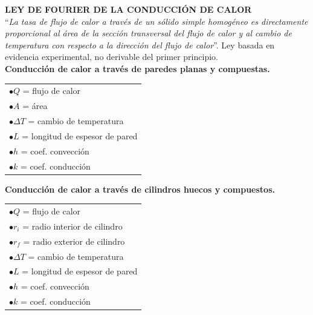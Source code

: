 \documentclass[11pt,a4paper,twocolumn]{article}
\begin{document}
	\textbf{LEY DE FOURIER DE LA CONDUCCIÓN DE CALOR}\\
	``\textit{La tasa de flujo de calor a través de un sólido simple homogéneo es directamente proporcional al área de la sección transversal del flujo de calor y al cambio de temperatura con respecto a la dirección del flujo de calor}''. Ley basada en evidencia experimental, no derivable del primer principio.\\
	
	\textbf{Conducción de calor a través de paredes planas y compuestas.}
	\begin{center}
	\end{center}
	\begin{tabular}{ l} 
		$\bullet Q$ = flujo de calor\\
		$\bullet A$ = área\\
		$\bullet \Delta T$ = cambio de temperatura\\
		$\bullet L$ = longitud de espesor de pared\\
		$\bullet h$ = coef. convección\\
		$\bullet k$ = coef. conducción\\
	\end{tabular}
	
	\textbf{Conducción de calor a través de cilindros huecos y compuestos.}
	\begin{center}
	\end{center}
	\begin{tabular}{ l} 
		$\bullet Q$ = flujo de calor\\
		$\bullet r_{i}$ = radio interior de cilindro\\
		$\bullet r_{f}$ = radio exterior de cilindro\\
		$\bullet \Delta T$ = cambio de temperatura\\
		$\bullet L$ = longitud de espesor de pared\\
		$\bullet h$ = coef. convección\\
		$\bullet k$ = coef. conducción\\
	\end{tabular}
	
\end{document}
